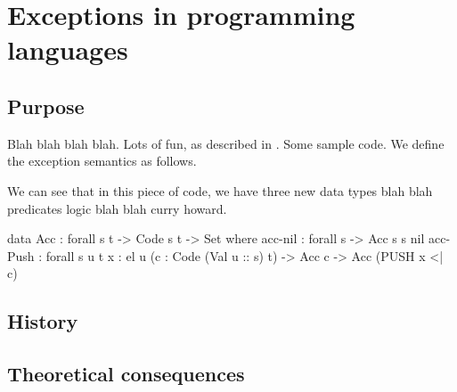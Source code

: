 \chapter{Exceptions in programming languages}

\section{Purpose}

Blah blah blah blah. Lots of fun, as described in \cite{swierstra:thesis}. Some sample code.
We define the exception semantics as follows.


\noindent We can see that in this piece of code, we have three new data types
blah blah predicates logic blah blah curry howard.

\begin{code}
  data Acc : forall {s t} -> Code s t -> Set where
    acc-nil : forall {s} -> Acc {s} {s} nil
    acc-Push : forall {s u t} {x : el u} (c : Code (Val u :: s) t)
      -> Acc c -> Acc (PUSH x <| c) 
\end{code}

\section{History}

\section{Theoretical consequences}

